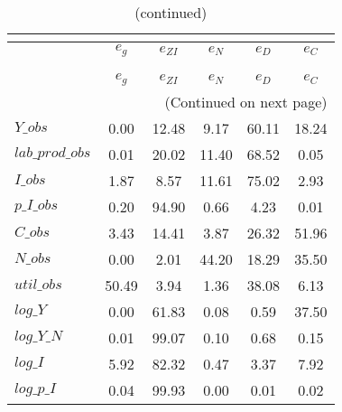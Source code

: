  
\begin{center}
\begin{longtable}{lccccc} 
\caption{VARIANCE DECOMPOSITION (in percent)}\\
 \label{Table:th_var_decomp_uncond}\\
\toprule 
$                $	 & 	 $       {e_g}$	 & 	 $    {e_{ZI}}$	 & 	 $       {e_N}$	 & 	 $       {e_D}$	 & 	 $       {e_C}$\\
\midrule \endfirsthead 
\caption{(continued)}\\
 \toprule \\ 
$                $	 & 	 $       {e_g}$	 & 	 $    {e_{ZI}}$	 & 	 $       {e_N}$	 & 	 $       {e_D}$	 & 	 $       {e_C}$\\
\midrule \endhead 
\midrule \multicolumn{6}{r}{(Continued on next page)} \\ \bottomrule \endfoot 
\bottomrule \endlastfoot 
$Y\_obs          $	 & 	        0.00	 & 	       12.48	 & 	        9.17	 & 	       60.11	 & 	       18.24 \\ 
$lab\_prod\_obs  $	 & 	        0.01	 & 	       20.02	 & 	       11.40	 & 	       68.52	 & 	        0.05 \\ 
$I\_obs          $	 & 	        1.87	 & 	        8.57	 & 	       11.61	 & 	       75.02	 & 	        2.93 \\ 
$p\_I\_obs       $	 & 	        0.20	 & 	       94.90	 & 	        0.66	 & 	        4.23	 & 	        0.01 \\ 
$C\_obs          $	 & 	        3.43	 & 	       14.41	 & 	        3.87	 & 	       26.32	 & 	       51.96 \\ 
$N\_obs          $	 & 	        0.00	 & 	        2.01	 & 	       44.20	 & 	       18.29	 & 	       35.50 \\ 
$util\_obs       $	 & 	       50.49	 & 	        3.94	 & 	        1.36	 & 	       38.08	 & 	        6.13 \\ 
$log\_Y          $	 & 	        0.00	 & 	       61.83	 & 	        0.08	 & 	        0.59	 & 	       37.50 \\ 
$log\_Y\_N       $	 & 	        0.01	 & 	       99.07	 & 	        0.10	 & 	        0.68	 & 	        0.15 \\ 
$log\_I          $	 & 	        5.92	 & 	       82.32	 & 	        0.47	 & 	        3.37	 & 	        7.92 \\ 
$log\_p\_I       $	 & 	        0.04	 & 	       99.93	 & 	        0.00	 & 	        0.01	 & 	        0.02 \\ 

\end{longtable}
\end{center}

